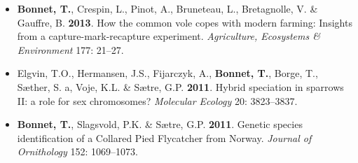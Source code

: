 \documentclass[a4paper,10pt]{article} %
\begin{document}
\begin{itemize}
\item \textbf{Bonnet, T.}, Crespin, L., Pinot, A., Bruneteau, L., Bretagnolle, V. \& Gauffre, B. \textbf{2013}. How the common vole copes with modern farming: Insights from a capture-mark-recapture experiment. \textit{Agriculture, Ecosystems \& Environment} 177: 21--27.
\item Elgvin, T.O., Hermansen, J.S., Fijarczyk, A., \textbf{Bonnet, T.}, Borge, T., S{\ae}ther, S. a, Voje, K.L. \& S{\ae}tre, G.P. \textbf{2011}. Hybrid speciation in sparrows II: a role for sex chromosomes? \textit{Molecular Ecology} 20: 3823--3837.
\item \textbf{Bonnet, T.}, Slagsvold, P.K. \& S{\ae}tre, G.P. \textbf{2011}. Genetic species identification of a Collared Pied Flycatcher from Norway. \textit{Journal of Ornithology} 152: 1069--1073.
\end{itemize}
\end{document}

